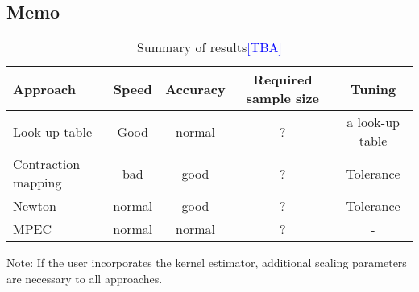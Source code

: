 \documentclass[12pt]{article}
\begin{document}
\subsection{Memo}

\begin{table}[!htbp]
  \begin{center}
      \caption{Summary of results\textcolor{blue}{[TBA]}}
      \begin{tabular}{lcccc} \hline
   Approach &  Speed & Accuracy & Required sample size & Tuning\\ 
   \hline
   Look-up table & Good & normal & ? & a look-up table \\ 
   Contraction mapping & bad & good & ? & Tolerance \\ 
   Newton & normal & good & ? & Tolerance \\ 
   MPEC & normal & normal & ? & - \\ 
   \hline
 \end{tabular}
 \label{tb:results} 
  \end{center}
  \footnotesize
  Note: If the user incorporates the kernel estimator, additional scaling parameters are necessary to all approaches.
\end{table} 
\end{document}
